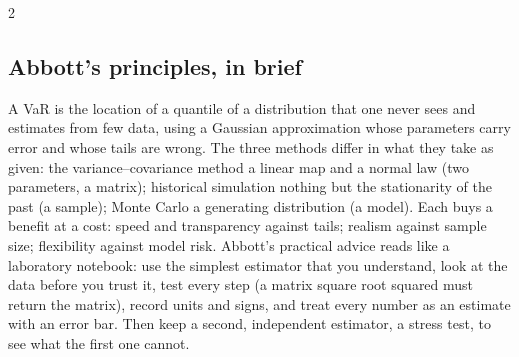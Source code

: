 \begin{paracol}{2}
\subsection{Abbott's principles, in brief}
\begin{intuition}\label{ch19:int-summary}
A VaR is the location of a quantile of a distribution that one never sees and estimates from few data, using a Gaussian approximation whose parameters carry error and whose tails are wrong. The three methods differ in what they take as given: the variance--covariance method a linear map and a normal law (two parameters, a matrix); historical simulation nothing but the stationarity of the past (a sample); Monte Carlo a generating distribution (a model). Each buys a benefit at a cost: speed and transparency against tails; realism against sample size; flexibility against model risk. Abbott's practical advice reads like a laboratory notebook: use the simplest estimator that you understand, look at the data before you trust it, test every step (a matrix square root squared must return the matrix), record units and signs, and treat every number as an estimate with an error bar. Then keep a second, independent estimator, a stress test, to see what the first one cannot.
\end{intuition}


\end{paracol}

